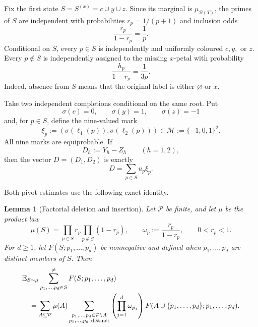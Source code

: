 \documentclass[11pt]{article}
\numberwithin{equation}{section}
\theoremstyle{plain}
\newtheorem{lemma}[theorem]{Lemma}
\newcommand{\E}{\mathbb E}
\newcommand{\1}{\mathbf 1}
\newcommand{\cB}{\mathcal B}
\newcommand{\cM}{\mathcal M}
\begin{document}
Fix the first state $S=S^{(x)}=c\cup y\cup z$.  Since its marginal is
$\mu_{\cB(T)}$, the primes of $S$ are independent with probabilities
$r_p=1/(p+1)$ and inclusion odds
\begin{equation}\label{eq:root-odds}
 \frac{r_p}{1-r_p}=\frac1p.
\end{equation}
Conditional on $S$, every $p\in S$ is independently and uniformly coloured
$c,y,$ or $z$.  Every $p\notin S$ is independently assigned to the missing
$x$-petal with probability
\begin{equation}\label{eq:missing-probability}
 \frac{h_p}{1-r_p}
 =\frac{1}{3p}.
\end{equation}
Indeed, absence from $S$ means that the original label is either
$\varnothing$ or $x$.

Take two independent completions conditional on the same root.  Put
\[
 \sigma(c)=0,\qquad \sigma(y)=1,\qquad \sigma(z)=-1
\]
and, for $p\in S$, define the nine-valued mark
\begin{equation}\label{eq:nine-marks}
 \xi_p:=(\sigma(\ell_1(p)),\sigma(\ell_2(p)))
 \in\cM:=\{-1,0,1\}^2.
\end{equation}
All nine marks are equiprobable.  If
\begin{equation}\label{eq:root-differences}
 D_h:=Y_h-Z_h\qquad(h=1,2),
\end{equation}
then the vector $D=(D_1,D_2)$ is exactly
\begin{equation}\label{eq:marked-sum}
 D=\sum_{p\in S}u_p\xi_p.
\end{equation}

Both pivot estimates use the following exact identity.

\begin{lemma}[Factorial deletion and insertion]\label{lem:factorial-insertion}
Let $\mathcal P$ be finite, and let $\mu$ be the product law
\[
 \mu(S)=\prod_{p\in S}r_p\prod_{p\notin S}(1-r_p),
 \qquad
 \omega_p:=\frac{r_p}{1-r_p},
 \qquad 0<r_p<1.
\]
For $d\ge1$, let $F(S;p_1,\ldots,p_d)$ be nonnegative and defined when
$p_1,\ldots,p_d$ are distinct members of $S$.  Then
\begin{align}
 &\E_{S\sim\mu}
 \sum_{p_1,\ldots,p_d\in S}^{\ne}
 F(S;p_1,\ldots,p_d)\notag\\
 &\quad=
 \sum_{A\subseteq\mathcal P}\mu(A)
 \sum_{\substack{p_1,\ldots,p_d\in\mathcal P\setminus A\\
                  p_1,\ldots,p_d\ \mathrm{distinct}}}
 \left(\prod_{j=1}^d\omega_{p_j}\right)
 F(A\cup\{p_1,\ldots,p_d\};p_1,\ldots,p_d).
                                                        \label{eq:factorial-insertion}
\end{align}
\end{lemma}
\end{document}
